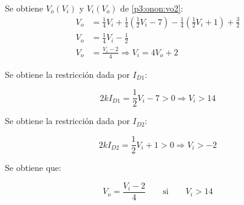 Se obtiene $V_o(V_i)$ y $V_i(V_o)$ de \ref{p3:onon:vo2}:
\begin{align*}
  V_o &=
    \frac{1}{4} V_i
    + \frac{1}{4} \left( \frac{1}{2} V_i - 7 \right)
    - \frac{1}{4} \left( \frac{1}{2} V_i + 1 \right)
    + \frac{3}{2}
  \\
  V_o &= \frac{1}{4} V_i - \frac{1}{2}
  \\
  V_o &= \frac{V_i - 2}{4} \Rightarrow V_i = 4 V_o + 2
\end{align*}

Se obtiene la restricción dada por $I_{D1}$:

\begin{equation*}
  2k I_{D1} = \frac{1}{2} V_i - 7 > 0
  \Rightarrow
  V_i > 14
\end{equation*}

Se obtiene la restricción dada por $I_{D2}$:

\begin{equation*}
  2k I_{D2} = \frac{1}{2} V_i + 1 > 0
  \Rightarrow
  V_i > -2
\end{equation*}

Se obtiene que:

\begin{equation} \label{p3:onon}
  V_o = \frac{V_i - 2}{4}
  \quad
  \quad
  \mathrm{si}
  \quad
  \quad
  V_i > 14
\end{equation}

